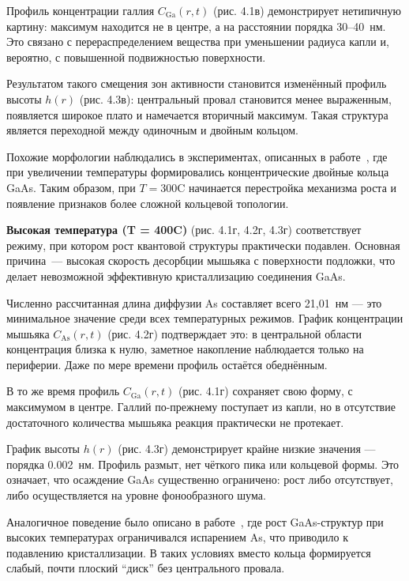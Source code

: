 \documentclass[14pt,oneside]{extarticle}
\begin{document}
Профиль концентрации галлия $C_\mathrm{Ga}(r, t)$ (рис. 4.1в) демонстрирует нетипичную картину: максимум находится не в центре, а на расстоянии порядка 30--40~нм. Это связано с перераспределением вещества при уменьшении радиуса капли и, вероятно, с повышенной подвижностью поверхности.

Результатом такого смещения зон активности становится изменённый профиль высоты $h(r)$ (рис. 4.3в): центральный провал становится менее выраженным, появляется широкое плато и намечается вторичный максимум. Такая структура является переходной между одиночным и двойным кольцом.

Похожие морфологии наблюдались в экспериментах, описанных в работе~\cite{mano2005nano}, где при увеличении температуры формировались концентрические двойные кольца GaAs. Таким образом, при $T = 300$\textdegree C начинается перестройка механизма роста и появление признаков более сложной кольцевой топологии.

\textbf{Высокая температура (T = 400\textdegree C)} (рис. 4.1г, 4.2г, 4.3г) соответствует режиму, при котором рост квантовой структуры практически подавлен. Основная причина~— высокая скорость десорбции мышьяка с поверхности подложки, что делает невозможной эффективную кристаллизацию соединения GaAs.

Численно рассчитанная длина диффузии As составляет всего 21{,}01~нм — это минимальное значение среди всех температурных режимов. График концентрации мышьяка $C_\mathrm{As}(r, t)$ (рис. 4.2г) подтверждает это: в центральной области концентрация близка к нулю, заметное накопление наблюдается только на периферии. Даже по мере времени профиль остаётся обеднённым.

В то же время профиль $C_\mathrm{Ga}(r, t)$ (рис. 4.1г) сохраняет свою форму, с максимумом в центре. Галлий по-прежнему поступает из капли, но в отсутствие достаточного количества мышьяка реакция практически не протекает.

График высоты $h(r)$ (рис. 4.3г) демонстрирует крайне низкие значения — порядка 0.002~нм. Профиль размыт, нет чёткого пика или кольцевой формы. Это означает, что осаждение GaAs существенно ограничено: рост либо отсутствует, либо осуществляется на уровне фонообразного шума.

Аналогичное поведение было описано в работе~\cite{fan2023evaporation}, где рост GaAs-структур при высоких температурах ограничивался испарением As, что приводило к подавлению кристаллизации. В таких условиях вместо кольца формируется слабый, почти плоский “диск” без центрального провала.
\end{document}
